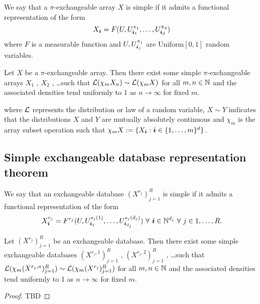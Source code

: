 We say that a $\pi$-exchangeable array $X$ is simple if it admits a functional representation of the form
\begin{equation}
  X_{\bm{i}} = F(U, U^{\pi_1}_{\bm{i}_1}, \dots, U^{\pi_d}_{\bm{i}_d})
\end{equation}
where $F$ is a measurable function and $U, U^{\pi_j}_{\bm{i}_j}$ are \iid Uniform$[0,1]$ random variables.

\begin{thm}
  \label{thm:piex}
  Let $X$ be a $\pi$-exchangeable array.
  Then there exist some simple $\pi$-exchangeable arrays $X_1$ , $X_2$ , \dots such that
  $\mathcal{L}(\chi_m X_n) \sim \mathcal{L}(\chi_m X)$ for all $m,n \in \mathbb{N}$ and the associated densities tend
  uniformly to 1 as $n \to \infty$ for fixed $m$.
\end{thm}

where $\mathcal{L}$ represents the distribution or law of a random variable, $X \sim Y$ indicates that the distributions $X$ and $Y$ are mutually absolutely continuous and $\chi_m$ is the array subset operation such that $\chi_m X := \{X_{\bm{i}} : \bm{i} \in \{1,\dots,m\}^d\}$.

\subsection{Simple exchangeable database representation theorem}

We say that an exchangeable database $(X^{r_j})_{j=1}^R$ is simple if it admits a functional representation of the form
\begin{equation}
  X^{r_j}_{\bm{i}} = F^{r_j}(U, U^{s_{j}(1)}_{\bm{i}_1},\dots,U^{s_{j}(d_j)}_{\bm{i}_{d_j}}) \,\, \forall \,\, \bm{i} \in \mathbb{N}^{d_j} \,\, \forall \,\, j \in {1,\dots,R}.
\end{equation}

\begin{thm}
  \label{thm:simple-database}
  Let $(X^{r_j})_{j=1}^R$ be an exchangeable database.
  Then there exist some simple exchangeable databases $(X^{r_j,1})_{j=1}^R$ , $(X^{r_j,2})_{j=1}^R$ , \dots such that
  $\mathcal{L}(\chi_m (X^{r_j,n})_{j=1}^R) \sim \mathcal{L}(\chi_m (X^{r_j})_{j=1}^R)$ for all $m,n \in \mathbb{N}$ and the associated densities tend
  uniformly to 1 as $n \to \infty$ for fixed $m$.
\end{thm}

\begin{proof}
TBD
\end{proof}

